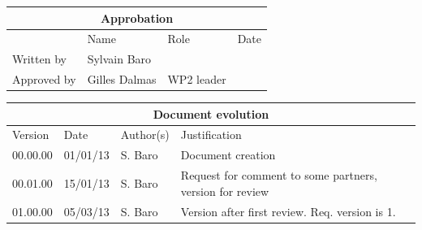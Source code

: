 \documentclass{template/openetcs_article}
\begin{document}
\begin{tabular}{|p{2.2cm}|p{4cm}|p{4cm}|p{2cm}|}
\hline
\multicolumn{4}{|c|}{Approbation} \\
\hline
  &  Name & Role & Date   \\
\hline  
Written by    &  Sylvain Baro &   & \\
\hline
Approved by & Gilles Dalmas & WP2 leader & \\
\hline
\end{tabular}

\begin{tabular}{|p{2.2cm}|p{2cm}|p{3cm}|p{5cm}|}
\hline
\multicolumn{4}{|c|}{Document evolution} \\
\hline
Version &  Date & Author(s) & Justification  \\
\hline  
00.00.00 & 01/01/13 & S. Baro &  Document creation  \\
\hline  
00.01.00 & 15/01/13 & S. Baro &  Request for comment to some partners, version for review  \\
\hline  
01.00.00 & 05/03/13 & S. Baro &  Version after first review. Req. version is 1. \\
\hline
\end{tabular}

\newpage

\tableofcontents
\newpage







\newcommand{\tbd}{\colorbox{cyan}{\%\%To Be Defined\%\%}}
\newcommand{\tbc}{\colorbox{cyan}{\%\%To Be Confirmed\%\%}}
\newcommand{\todo}[1]{\colorbox{cyan}{\%\%{#1}\%\%}}
\newlength{\origindent}

\newenvironment{issue}{
	\begin{quote}
	\begin{itshape}Open Issue. 
}{
	\end{itshape}
	\end{quote}
}

\newenvironment{comment}{
	\begin{quote}
	\begin{itshape}Comment. 
}{
	\end{itshape}
	\end{quote}
}
\end{document}
